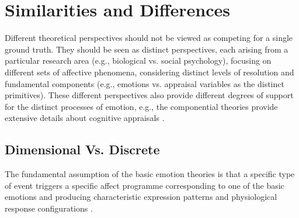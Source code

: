 \documentclass[11pt]{article}
\begin{document}
\section{Similarities and Differences}

Different theoretical perspectives should not be viewed as competing for a
single ground truth. They should be seen as distinct perspectives, each arising
from a particular research area (e.g., biological vs. social psychology),
focusing on different sets of affective phenomena, considering distinct levels
of resolution and fundamental components (e.g., emotions vs. appraisal variables
as the distinct primitives). These different perspectives also provide different
degrees of support for the distinct processes of emotion, e.g., the componential
theories provide extensive details about cognitive appraisals
\cite{hudlicka:guidelines-emotions}.

\subsection{Dimensional Vs. Discrete}

The fundamental assumption of the basic emotion theories is that a specific type
of event triggers a specific affect programme corresponding to one of the basic
emotions and producing characteristic expression patterns and physiological
response configurations \cite{scherer:emotions-emergent}.
\end{document}
